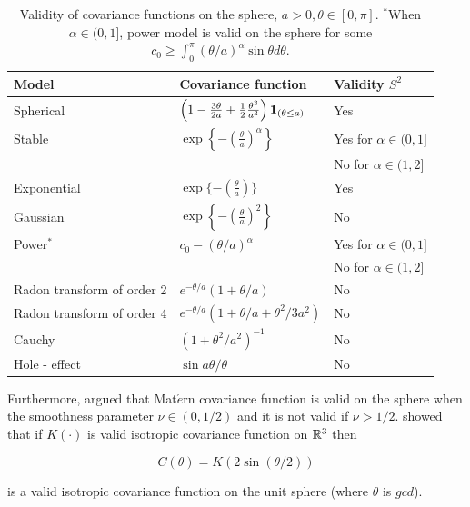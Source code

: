 \begin{table}[H]
	\label{valid_cov_models}
	\centering
	\begin{tabular}[htb]{lll} \hline \hline
		Model & Covariance function & Validity  $S^2$           \\   \hline Spherical  &
		$\left(1-\frac{3\theta}{2a} + \frac{1}{2}
		\frac{\theta^3}{a^3}\right){\bf 1}_{(\theta \le a)}$ & Yes   \\
		[2ex]
		Stable     & $\exp\left\{-\left(\frac{\theta}{a}\right)^\alpha\right\}$ & Yes for $\alpha \in (0,1]$  \\
		      &                     & No for $\alpha \in (1,2]$ \\ [2ex] \hspace{0.2in} Exponential &
		$\exp \{-\left(\frac{\theta}{a}\right) \}$ & Yes \\ [2ex]
		\hspace{0.2in} Gaussian & $\exp\left\{-\left(\frac{\theta}{a} \right)^2
		\right\}$  & No \\ [2ex]
		Power$^*$   & $c_0 - (\theta/a)^\alpha$ & Yes for  $\alpha \in (0,1] $  \\
		& & No for $\alpha \in (1,2]$ \\ [2ex]
		Radon transform of order 2         & $e^{-\theta/a}(1+\theta/a)$ &
		No        \\ [2ex] Radon transform of order 4         &
		$e^{-\theta/a} (1+\theta/a+\theta^2/3a^2)$  & No  \\ [2ex] Cauchy &
		$(1+\theta^2/a^2)^{-1}$ &  No      \\ [2ex] Hole - effect & $\sin
		a\theta / \theta$ & No    \\ \hline \hline
	\end{tabular}
	\caption{Validity of covariance functions on the sphere, $a >
		0,\theta \in [0,\pi]$. $^*$When $\alpha \in (0,1]$, power model is
			valid on the sphere  for some $c_0 \ge \int_0^\pi
			(\theta/a)^{\alpha} \sin \theta d \theta$.} \label{tab:t1}
				
	\end{table}
	
	Furthermore, \cite{Gneiting2013} argued that Mat$\acute{e}$rn covariance function is valid on the sphere when the smoothness parameter $\nu\in(0,1/2)$ and it is not valid if $\nu>1/2$. \cite{Yadrenko1983} showed that if $K(\cdot)$ is valid isotropic covariance function on $\mathbb{R}^3$ then
	
	\[
		C(\theta) = K(2\sin(\theta/2))
	\]
	
	is a valid isotropic covariance function on the unit sphere (where $\theta$ is $gcd$).\\
	
